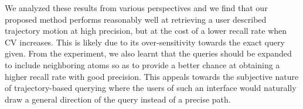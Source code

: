 \documentclass[runningheads]{llncs}
\begin{document}
We analyzed these results from various perspectives and we find that our proposed method performs reasonably well at retrieving a user described trajectory motion at high precision, but at the cost of a lower recall rate when CV increases. This is likely due to its over-sensitivity towards the exact query given. 
From the experiment, we also learnt that the queries should be expanded to include neighboring atoms so as to provide a better chance at obtaining a higher recall rate with good precision. This appeals towards the subjective nature of trajectory-based querying where the users of such an interface would naturally draw a general direction of the query instead of a precise path. 
\end{document}
